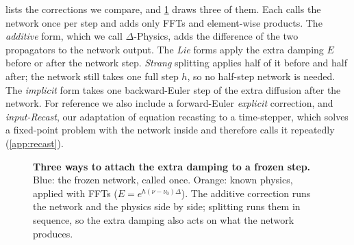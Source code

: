 \documentclass{article}
\theoremstyle{plain}
\newcommand{\add}{additive correction\xspace}
\newcommand{\dphys}{$\Delta$-Physics\xspace}
\begin{document}
 lists the corrections we compare, and \cref{fig:method} draws three of them.
Each calls the network once per step and adds only FFTs and element-wise products.
The \emph{additive} form, which we call \dphys, adds the difference of the two propagators to the network output.
The \emph{Lie} forms apply the extra damping $E$ before or after the network step.
\emph{Strang} splitting applies half of it before and half after; the network still takes one full step $h$, so no half-step network is needed.
The \emph{implicit} form takes one backward-Euler step of the extra diffusion after the network.
For reference we also include a forward-Euler \emph{explicit} correction, and \emph{input-Recast}, our adaptation of equation recasting \citep{cheng2026mdpnop,cheng2026recast} to a time-stepper, which solves a fixed-point problem with the network inside and therefore calls it repeatedly (\cref{app:recast}).

\begin{figure}[t]
\centering
{}
\caption{\textbf{Three ways to attach the extra damping to a frozen step.} Blue: the frozen network, called once. Orange: known physics, applied with FFTs ($E=e^{h(\nu-\nu_0)\Delta}$). The \add runs the network and the physics side by side; splitting runs them in sequence, so the extra damping also acts on what the network produces.}
\label{fig:method}
\end{figure}
\end{document}
